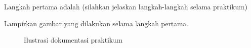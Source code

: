 \item Langkah pertama adalah (silahkan jelaskan langkah-langkah
      selama praktikum)

      Lampirkan gambar yang dilakukan selama langkah pertama.

      \begin{figure}[H]
        \centering
        \caption{Ilustrasi dokumentasi praktikum}
      \end{figure}